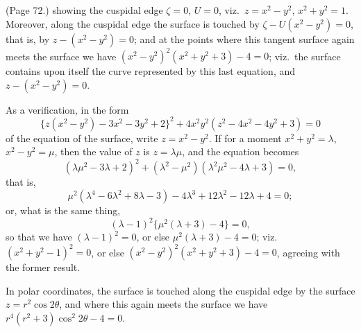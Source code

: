 \documentclass[11pt,a4paper]{article}
\begin{document}
\noindent (Page 72.) showing the cuspidal edge $\zeta = 0$, $U = 0$, viz.\ $z = x^2 - y^2$, $x^2 + y^2 = 1$. Moreover, along the cuspidal edge the surface is touched by $\zeta - U(x^2 - y^2) = 0$, that is, by $z - (x^2 - y^2) = 0$; and at the points where this tangent surface again meets the surface we have $(x^2 - y^2)^2 (x^2 + y^2 + 3) - 4 = 0$; viz.\ the surface contains upon itself the curve represented by this last equation, and $z - (x^2 - y^2) = 0$.

As a verification, in the form
\[
\{z(x^2 - y^2) - 3x^2 - 3y^2 + 2\}^2 + 4x^2 y^2 (z^2 - 4x^2 - 4y^2 + 3) = 0
\]
of the equation of the surface, write $z = x^2 - y^2$. If for a moment $x^2 + y^2 = \lambda$, $x^2 - y^2 = \mu$, then the value of $z$ is $z = \lambda\mu$, and the equation becomes
\[
(\lambda\mu^2 - 3\lambda + 2)^2 + (\lambda^2 - \mu^2)(\lambda^2\mu^2 - 4\lambda + 3) = 0,
\]
that is,
\[
\mu^2 (\lambda^4 - 6\lambda^2 + 8\lambda - 3) - 4\lambda^3 + 12\lambda^2 - 12\lambda + 4 = 0;
\]
or, what is the same thing,
\[
(\lambda - 1)^2 \{\mu^2 (\lambda + 3) - 4\} = 0,
\]
so that we have $(\lambda - 1)^2 = 0$, or else $\mu^2 (\lambda + 3) - 4 = 0$; viz.\ $(x^2 + y^2 - 1)^2 = 0$, or else $(x^2 - y^2)^2 (x^2 + y^2 + 3) - 4 = 0$, agreeing with the former result.

In polar coordinates, the surface is touched along the cuspidal edge by the surface $z = r^2 \cos 2\theta$, and where this again meets the surface we have $r^4 (r^2 + 3) \cos^2 2\theta - 4 = 0$.
\end{document}
